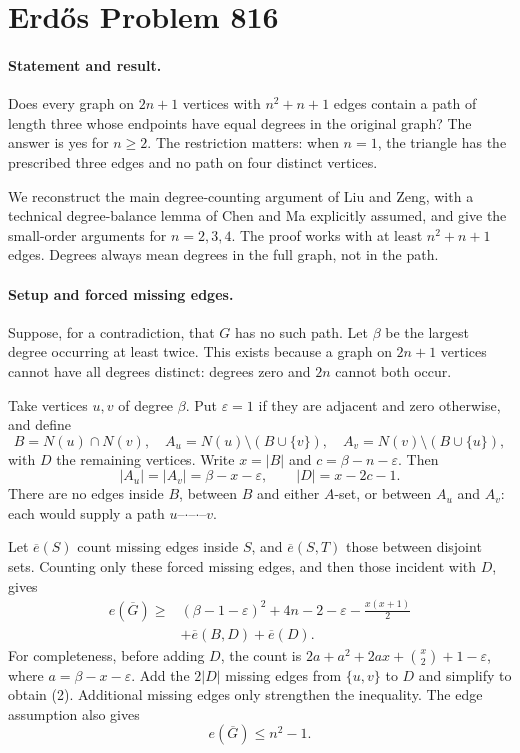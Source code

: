 \section*{Erd\H{o}s Problem 816}

\paragraph{Statement and result.}
Does every graph on \(2n+1\) vertices with \(n^2+n+1\) edges contain a path of length three whose endpoints have equal degrees in the original graph? The answer is yes for \(n\geq2\). The restriction matters: when \(n=1\), the triangle has the prescribed three edges and no path on four distinct vertices.

We reconstruct the main degree-counting argument of Liu and Zeng, with a technical degree-balance lemma of Chen and Ma explicitly assumed, and give the small-order arguments for \(n=2,3,4\). The proof works with at least \(n^2+n+1\) edges. Degrees always mean degrees in the full graph, not in the path.

\paragraph{Setup and forced missing edges.}
Suppose, for a contradiction, that \(G\) has no such path. Let \(\beta\) be the largest degree occurring at least twice. This exists because a graph on \(2n+1\) vertices cannot have all degrees distinct: degrees zero and \(2n\) cannot both occur.

Take vertices \(u,v\) of degree \(\beta\). Put \(\varepsilon=1\) if they are adjacent and zero otherwise, and define
\[
 B=N(u)\cap N(v),\quad
 A_u=N(u)\setminus(B\cup\{v\}),\quad
 A_v=N(v)\setminus(B\cup\{u\}),
\]
with \(D\) the remaining vertices. Write \(x=|B|\) and \(c=\beta-n-\varepsilon\). Then
\[
 |A_u|=|A_v|=\beta-x-\varepsilon,
 \qquad |D|=x-2c-1.
\tag{1}
\]
There are no edges inside \(B\), between \(B\) and either \(A\)-set, or between \(A_u\) and \(A_v\): each would supply a path \(u\)--\(\cdot\)--\(\cdot\)--\(v\).

Let \(\overline e(S)\) count missing edges inside \(S\), and \(\overline e(S,T)\) those between disjoint sets. Counting only these forced missing edges, and then those incident with \(D\), gives
\[
 \begin{split}
 e(\overline G)\geq{}&(\beta-1-\varepsilon)^2+4n-2-\varepsilon
       -\frac{x(x+1)}2\\
 &+\overline e(B,D)+\overline e(D).
 \end{split}
\tag{2}
\]
For completeness, before adding \(D\), the count is
\(2a+a^2+2ax+\binom x2+1-\varepsilon\), where \(a=\beta-x-\varepsilon\). Add the \(2|D|\) missing edges from \(\{u,v\}\) to \(D\) and simplify to obtain (2). Additional missing edges only strengthen the inequality. The edge assumption also gives
\[
 e(\overline G)\leq n^2-1.
\tag{3}
\]

